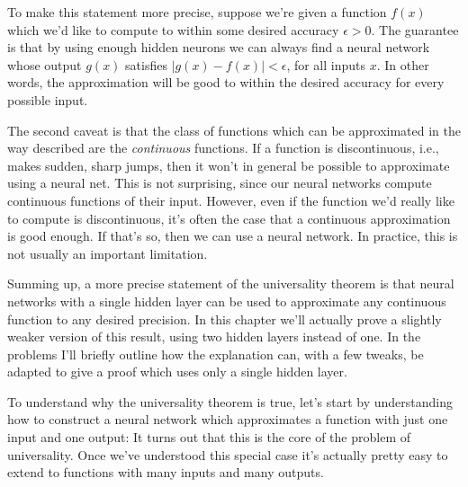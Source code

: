 To make this statement more precise, suppose we're given a function $f(x)$ which we'd like to compute to within some desired accuracy $\epsilon > 0$. The guarantee is that by using enough hidden neurons we can always find a neural network whose output $g(x)$ satisfies $|g(x) - f(x)| < \epsilon$, for all inputs $x$. In other words, the approximation will be good to within the desired accuracy for every possible input.


The second caveat is that the class of functions which can be approximated in the way described are the \emph{continuous} functions. If a function is discontinuous, i.e., makes sudden, sharp jumps, then it won't in general be possible to approximate using a neural net. This is not surprising, since our neural networks compute continuous functions of their input. However, even if the function we'd really like to compute is discontinuous, it's often the case that a continuous approximation is good enough. If that's so, then we can use a neural network. In practice, this is not usually an important limitation.


Summing up, a more precise statement of the universality theorem is that neural networks with a single hidden layer can be used to approximate any continuous function to any desired precision. In this chapter we'll actually prove a slightly weaker version of this result, using two hidden layers instead of one. In the problems I'll briefly outline how the explanation can, with a few tweaks, be adapted to give a proof which uses only a single hidden layer.





To understand why the universality theorem is true, let's start by understanding how to construct a neural network which approximates a function with just one input and one output: It turns out that this is the core of the problem of universality. Once we've understood this special case it's actually pretty easy to extend to functions with many inputs and many outputs.


